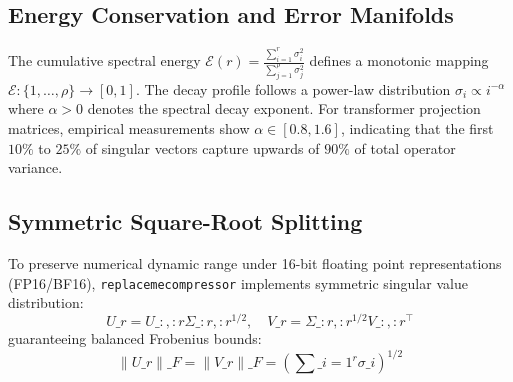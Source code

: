 \subsection{Energy Conservation and Error Manifolds}
The cumulative spectral energy $\mathcal{E}(r) = \frac{\sum_{i=1}^r \sigma_i^2}{\sum_{j=1}^\rho \sigma_j^2}$ defines a monotonic mapping $\mathcal{E}: \{1, \dots, \rho\} \to [0, 1]$. The decay profile follows a power-law distribution $\sigma_i \propto i^{-\alpha}$ where $\alpha > 0$ denotes the spectral decay exponent. For transformer projection matrices, empirical measurements show $\alpha \in [0.8, 1.6]$, indicating that the first $10\%$ to $25\%$ of singular vectors capture upwards of $90\%$ of total operator variance.

\subsection{Symmetric Square-Root Splitting}
To preserve numerical dynamic range under 16-bit floating point representations (FP16/BF16), \texttt{replacemecompressor} implements symmetric singular value distribution:
\[
U\_r = U\_{:, :r} \Sigma\_{:r, :r}^{1/2}, \quad V\_r = \Sigma\_{:r, :r}^{1/2} V\_{:, :r}^\top
\]
guaranteeing balanced Frobenius bounds:
\[
\|U\_r\|\_F = \|V\_r\|\_F = \left( \sum\_{i=1}^{r} \sigma\_i \right)^{1/2}
\]
